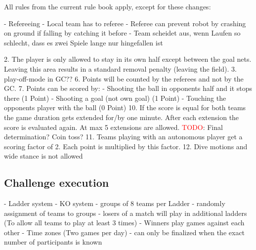 \newpage
All rules from the current rule book apply, except for these changes:

- Refereeing
    - Local team has to referee
    - Referee can prevent robot by crashing on ground if falling by catching it before
    - Team scheidet aus, wenn Laufen so schlecht, dass es zwei Spiele lange nur hingefallen ist

2. The player is only allowed to stay in its own half except between the goal nets. Leaving this area results in a standard removal penalty (leaving the field).
3. play-off-mode in GC?? 
6. Points will be counted by the referees and not by the GC.
7. Points can be scored by:
    - Shooting the ball in opponents half and it stops there (1 Point)
    - Shooting a goal (not own goal) (1 Point)
    - Touching the opponents player with the ball (0 Point)
10. If the score is equal for both teams the game duration gets extended for/by one minute. After each extension the score is evaluated again. At max 5 extensions are allowed. \textcolor{red}{TODO}: Final determination? Coin toss?
11. Teams playing with an autonomous player get a scoring factor of 2. Each point is multiplied by this factor.
12. Dive motions and wide stance is not allowed

\subsection{Challenge execution}
- Ladder system
    - KO system 
    - groups of 8 teams per Ladder
    - randomly assignment of teams to groups
    - losers of a match will play in additional ladders (To allow all teams to play at least 3 times)
    - Winners play games against each other
    - Time zones (Two games per day)
    - can only be finalized when the exact number of participants is known